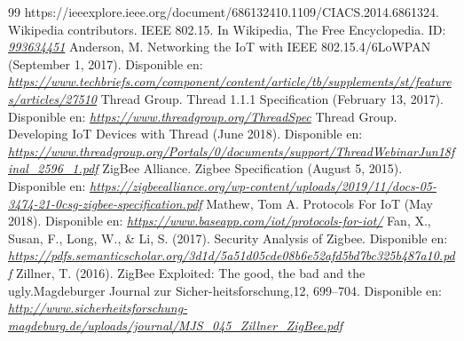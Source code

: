 \begin{thebibliography}{99}
{{https://ieeexplore.ieee.org/document/6861324}{10.1109/CIACS.2014.6861324.}}
 Wikipedia contributors. IEEE 802.15. In Wikipedia, The Free Encyclopedia. ID: {\it\href{https://en.wikipedia.org/wiki/IEEE_802.15}{993634451}}
 Anderson, M. Networking the IoT with IEEE 802.15.4/6LoWPAN (September 1, 2017). Disponible en: {\it\url{ https://www.techbriefs.com/component/content/article/tb/supplements/st/features/articles/27510}}
 Thread Group. Thread 1.1.1 Specification (February 13, 2017). Disponible en: {\it\url{
https://www.threadgroup.org/ThreadSpec}}
 Thread Group. Developing IoT Devices with Thread (June 2018). Disponible en: {\it\url{
https://www.threadgroup.org/Portals/0/documents/support/ThreadWebinarJun18final_2596_1.pdf}}
 ZigBee Alliance. Zigbee Specification (August 5, 2015). Disponible en: {\it\url{ https://zigbeealliance.org/wp-content/uploads/2019/11/docs-05-3474-21-0csg-zigbee-specification.pdf}}
 Mathew, Tom A. Protocols For IoT (May 2018). Disponible en: {\it\url{
https://www.baseapp.com/iot/protocols-for-iot/}}
 Fan, X., Susan, F., Long, W., \& Li, S. (2017). Security Analysis of Zigbee. Disponible en: {\it\url{ https://pdfs.semanticscholar.org/3d1d/5a51d05cde08b6e52afd5bd7bc325b487a10.pdf}}
 Zillner, T. (2016).  ZigBee Exploited: The good, the bad and the ugly.Magdeburger Journal zur Sicher-heitsforschung,12, 699–704. Disponible en: {\it\url{ http://www.sicherheitsforschung-magdeburg.de/uploads/journal/MJS\_045\_Zillner\_ZigBee.pdf}}

\end{thebibliography}
